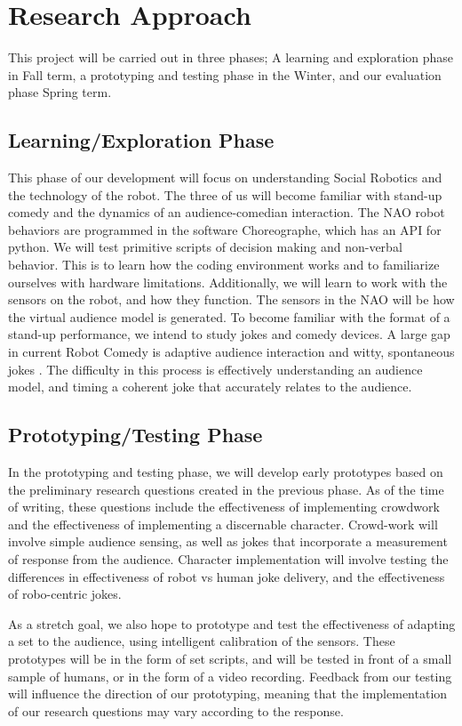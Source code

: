 \documentclass[onecolumn, draftclsnofoot,10pt, compsoc]{IEEEtran}
\begin{document}
\section{Research Approach}
This project will be carried out in three phases; A learning and exploration phase in Fall term, a prototyping and testing phase in the Winter, and our evaluation phase Spring term.

\subsection{Learning/Exploration Phase}
This phase of our development will focus on understanding Social Robotics and the technology of the robot. The three of us will become familiar with stand-up comedy and the dynamics of an audience-comedian interaction. The NAO robot behaviors are programmed in the software Choreographe, which has an API for python. We will test primitive scripts of decision making and non-verbal behavior. This is to learn how the coding environment works and to familiarize ourselves with hardware limitations. Additionally, we will learn to work with the sensors on the robot, and how they function. The sensors in the NAO will be how the virtual audience model is generated. To become familiar with the format of a stand-up performance, we intend to study jokes and comedy devices. A large gap in current Robot Comedy is adaptive audience interaction and witty, spontaneous jokes \cite{KatevasRobot:2014}. The difficulty in this process is effectively understanding an audience model, and timing a coherent joke that accurately relates to the audience.

\subsection{Prototyping/Testing Phase}
In the prototyping and testing phase, we will develop early prototypes based on the preliminary research questions created in the previous phase. As of the time of writing, these questions include the effectiveness of implementing crowdwork and the effectiveness of implementing a discernable character. Crowd-work will involve simple audience sensing, as well as jokes that incorporate a measurement of response from the audience. Character implementation will involve testing the differences in effectiveness of robot vs human joke delivery, and the effectiveness of robo-centric jokes.

As a stretch goal, we also hope to prototype and test the effectiveness of adapting a set to the audience, using intelligent calibration of the sensors. These prototypes will be in the form of set scripts, and will be tested in front of a small sample of humans, or in the form of a video recording. Feedback from our testing will influence the direction of our prototyping, meaning that the implementation of our research questions may vary according to the response.
\end{document}
